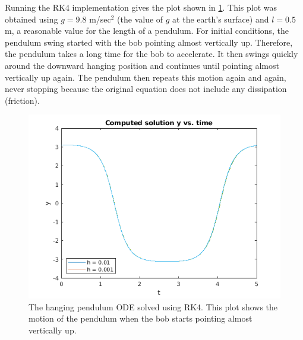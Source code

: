 \documentclass[hidelinks,notitlepage]{book}
\begin{document}
Running the RK4 implementation gives the plot shown in \cref{fig:RealHangingPendulumRK4}.  This plot was obtained using $g = 9.8$ m/sec$^2$ (the value of $g$ at the earth's surface) and $l = 0.5$m, a reasonable value for the length of a pendulum.  For initial conditions, the pendulum swing started with the bob pointing almost vertically up.  Therefore, the pendulum takes a long time for the bob to accelerate.  It then swings quickly around the downward hanging position and continues until pointing almost vertically up again.  The pendulum then repeats this motion again and again, never stopping because the original equation does not include any dissipation (friction).
\begin{figure}[tbh]
	\centering
	\includegraphics[width=0.7\columnwidth]{RealHangingPendulumRK4.png}
	\caption{The hanging pendulum ODE solved using RK4.  This plot shows the motion of the pendulum when the bob starts pointing almost vertically up.}
	\label{fig:RealHangingPendulumRK4}
\end{figure}
\end{document}
